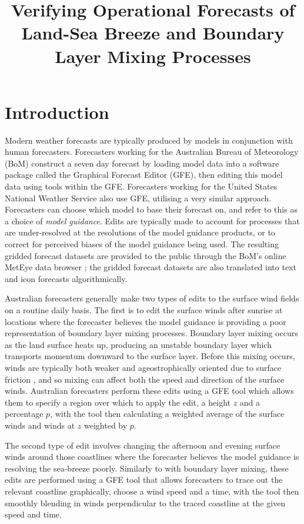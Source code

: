 \documentclass[twocol]{ametsoc}
\title{Verifying Operational Forecasts of Land-Sea Breeze and Boundary Layer Mixing Processes}
\affiliation{School of Earth Sciences, and ARC Centre of Excellence for Climate Extremes, The University of Melbourne, Melbourne, Victoria, Australia.}
\begin{document}
\maketitle

\section{Introduction}
\label{Sec:Introduction}
Modern weather forecasts are typically produced by models in conjunction with human forecasters. Forecasters working for the Australian Bureau of Meteorology (BoM) construct a seven day forecast by loading model data into a software package called the Graphical Forecast Editor (GFE), then editing this model data using tools within the GFE. Forecasters working for the United States National Weather Service also use GFE, utilising a very similar approach. Forecasters can choose which model to base their forecast on, and refer to this as a choice of \textit{model guidance}. Edits are typically made to account for processes that are under-resolved at the resolutions of the model guidance products, or to correct for perceived biases of the model guidance being used. The resulting gridded forecast datasets are provided to the public through the BoM's online MetEye data browser \citep{bomMetEye19}; the gridded forecast datasets are also translated into text and icon forecasts algorithmically.  

Australian forecasters generally make two types of edits to the surface wind fields on a routine daily basis. The first is to edit the surface winds after sunrise at locations where the forecaster believes the model guidance is providing a poor representation of boundary layer mixing processes. Boundary layer mixing occurs as the land surface heats up, producing an unstable boundary layer which transports momentum downward to the surface layer. Before this mixing occurs, winds are typically both weaker and ageostrophically oriented due to surface friction \citep{lee18}, and so mixing can affect both the speed and direction of the surface winds. Australian forecasters perform these edits using a GFE tool which allows them to specify a region over which to apply the edit, a height $z$ and a percentage $p$, with the tool then calculating a weighted average of the surface winds and winds at $z$ weighted by $p$.

The second type of edit involves changing the afternoon and evening surface winds around those coastlines where the forecaster believes the model guidance is resolving the sea-breeze poorly. Similarly to with boundary layer mixing, these edits are performed using a GFE tool that allows forecasters to trace out the relevant coastline graphically, choose a wind speed and a time, with the tool then smoothly blending in winds perpendicular to the traced coastline at the given speed and time.
\end{document}
